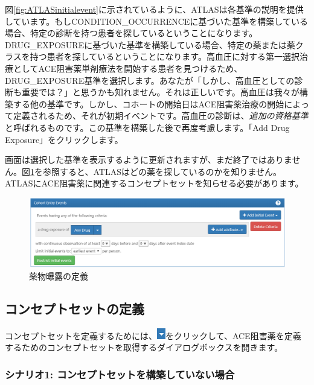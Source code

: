 \documentclass[
  11pt]{book}
\theoremstyle{definition}
\theoremstyle{definition}
\theoremstyle{definition}
\theoremstyle{definition}
\theoremstyle{remark}
\begin{document}
図\ref{fig:ATLASinitialevent}に示されているように、ATLASは各基準の説明を提供しています。もしCONDITION\_OCCURRENCEに基づいた基準を構築している場合、特定の診断を持つ患者を探しているということになります。DRUG\_EXPOSUREに基づいた基準を構築している場合、特定の薬または薬クラスを持つ患者を探しているということになります。高血圧に対する第一選択治療としてACE阻害薬単剤療法を開始する患者を見つけるため、DRUG\_EXPOSURE基準を選択します。あなたが「しかし、高血圧としての診断も重要では？」と思うかも知れません。それは正しいです。高血圧は我々が構築する他の基準です。しかし、コホートの開始日はACE阻害薬治療の開始によって定義されるため、それが初期イベントです。高血圧の診断は、\emph{追加の資格基準}と呼ばれるものです。この基準を構築した後で再度考慮します。「Add Drug Exposure」をクリックします。

画面は選択した基準を表示するように更新されますが、まだ終了ではありません。図\ref{fig:ATLASdrugexposure}を参照すると、ATLASはどの薬を探しているのかを知りません。ATLASにACE阻害薬に関連するコンセプトセットを知らせる必要があります。

\begin{figure}

{\centering \includegraphics[width=1\linewidth]{images/Cohorts/ATLAS-drugexposure} 

}

\caption{薬物曝露の定義}\label{fig:ATLASdrugexposure}
\end{figure}

\subsection{コンセプトセットの定義}\label{ux30b3ux30f3ux30bbux30d7ux30c8ux30bbux30c3ux30c8ux306eux5b9aux7fa9}

コンセプトセットを定義するためには、\includegraphics{images/Cohorts/downarrow.png}をクリックして、ACE阻害薬を定義するためのコンセプトセットを取得するダイアログボックスを開きます。

\subsubsection*{シナリオ1: コンセプトセットを構築していない場合}\label{ux30b7ux30caux30eaux30aa1-ux30b3ux30f3ux30bbux30d7ux30c8ux30bbux30c3ux30c8ux3092ux69cbux7bc9ux3057ux3066ux3044ux306aux3044ux5834ux5408}
\end{document}
